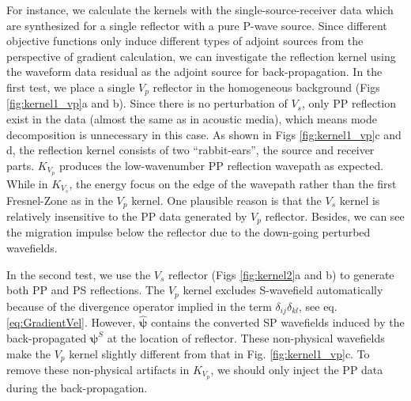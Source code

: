\documentclass[extra,mreferee]{gji}
\newcommand{\bsy}[1]{\boldsymbol{{}#1}}
\begin{document}
For instance, we calculate the kernels with the single-source-receiver data
which are synthesized for a single reflector with a pure P-wave source.
Since different objective functions only induce different types of adjoint
sources from the perspective of gradient calculation, we can investigate the reflection kernel 
using the waveform data residual as the adjoint source for back-propagation.
In the first test, we place a single $V_p$ reflector in the homogeneous background
(Figs \ref{fig:kernel1_vp}a and b). 
Since there is no perturbation of $V_s$, only PP reflection exist in the data (almost
the same as in acoustic media), which means mode decomposition is unnecessary in this
case.
As shown in Figs \ref{fig:kernel1_vp}c and d, the reflection
kernel consists of two ``rabbit-ears'', the
source and receiver parts. $K_{V_p}$ produces the low-wavenumber PP reflection
wavepath as expected.
While in $K_{V_s}$, the energy focus on the edge of the wavepath rather than the first Fresnel-Zone as in the $V_p$ kernel.
One plausible reason is that the $V_s$ kernel is relatively insensitive to the PP data generated by $V_p$ reflector.
Besides, we can see the migration impulse below the reflector due to the down-going perturbed wavefields.


In the second test, we use the $V_s$ reflector (Figs \ref{fig:kernel2}a and
b) to generate both PP
and PS reflections.
The $V_p$ kernel excludes S-wavefield automatically because of the divergence operator 
implied in the term $\delta_{ij}\delta_{kl}$, see eq. \eqref{eq:GradientVel}. 
However, $\bsy{\hat\psi}$ contains the converted SP wavefields 
induced by the back-propagated  $\bsy{\psi}^S$ at the location of reflector.
These non-physical wavefields make the $V_p$ kernel slightly different from that in
Fig. \ref{fig:kernel1_vp}c.
To remove these non-physical artifacts in $K_{V_p}$, we should only inject the PP data during the
back-propagation. 
\end{document}
